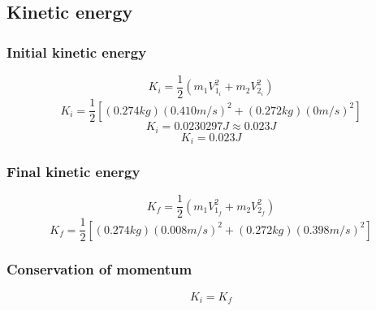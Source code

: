 \documentclass[11pt, letterpaper, includehead]{article}
\begin{document}
\subsection{Kinetic energy}

\subsubsection{Initial kinetic energy}
$$K_i = \frac{1}{2}(m_1 V_{1_i}^2 + m_2 V_{2_i}^2)$$
$$K_i = \frac{1}{2}[(0.274kg) (0.410m/s)^2 + (0.272kg)(0m/s)^2]$$
$$K_i = 0.0230297 J \approx 0.023 J$$ 
$$\boxed{K_i =  0.023 J}$$ 

\subsubsection{Final kinetic energy}
$$K_f = \frac{1}{2}(m_1 V_{1_f}^2 + m_2 V_{2_f}^2)$$
$$K_f = \frac{1}{2}[(0.274kg) (0.008m/s)^2 + (0.272kg) (0.398m/s)^2]$$

\subsubsection{Conservation of momentum}
$$K_i = K_f$$

\end{document}

